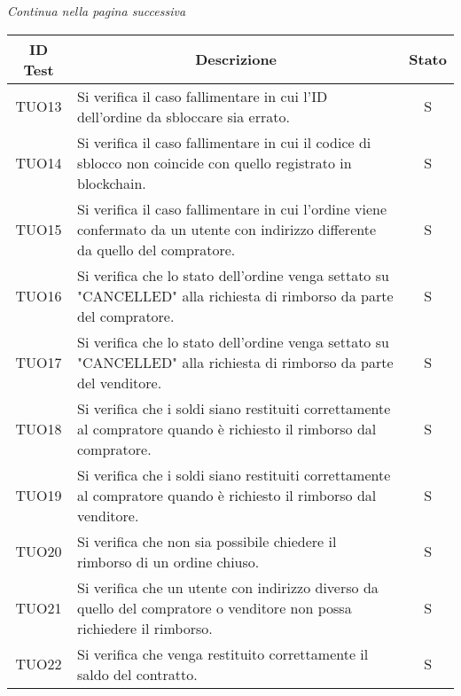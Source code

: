 \begin{center}
  \textit{\small Continua nella pagina successiva}
\end{center}
\begin{table}[H]
  \centering
  \renewcommand{\arraystretch}{1.8}
  \begin{tabular}{c|p{10cm}|c}
    \rowcolor[HTML]{125E28}
    \color[HTML]{FFFFFF}\textbf{ID Test}
          & \multicolumn{1}{c}{\color[HTML]{FFFFFF}\textbf{Descrizione}}
          & \color[HTML]{FFFFFF}\textbf{Stato}                                                                                                    \\
    \hline
    TUO13 & Si verifica il caso fallimentare in cui l'ID dell'ordine da sbloccare sia errato.                                                 & S \\
    TUO14 & Si verifica il caso fallimentare in cui il codice di sblocco non coincide con quello registrato in blockchain\glo{}.              & S \\
    TUO15 & Si verifica il caso fallimentare in cui l'ordine viene confermato da un utente con indirizzo differente da quello del compratore. & S \\
    TUO16 & Si verifica che lo stato dell'ordine venga settato su "CANCELLED" alla richiesta di rimborso da parte del compratore.             & S \\
    TUO17 & Si verifica che lo stato dell'ordine venga settato su "CANCELLED" alla richiesta di rimborso da parte del venditore.              & S \\
    TUO18 & Si verifica che i soldi siano restituiti correttamente al compratore quando è richiesto il rimborso dal compratore.               & S \\
    TUO19 & Si verifica che i soldi siano restituiti correttamente al compratore quando è richiesto il rimborso dal venditore.                & S \\
    TUO20 & Si verifica che non sia possibile chiedere il rimborso di un ordine chiuso.                                                       & S \\
    TUO21 & Si verifica che un utente con indirizzo diverso da quello del compratore o venditore non possa richiedere il rimborso.            & S \\
    TUO22 & Si verifica che venga restituito correttamente il saldo del contratto.                                                            & S \\

\end{tabular}
\end{table}

